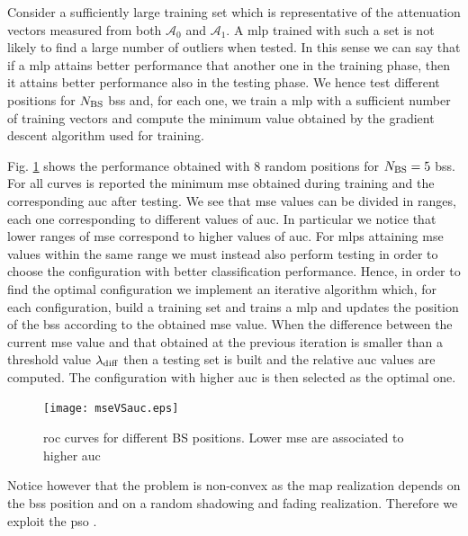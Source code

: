 \documentclass[twocolumns]{IEEEtran}
\begin{document}
Consider a sufficiently large training set which is representative of the attenuation vectors measured from both $\mathcal{A}_0$ and $\mathcal{A}_1$. A \ac{mlp} trained with such a set is not likely to find a large number of outliers when tested. In this sense we can say that if a \ac{mlp} attains better performance that another one in the training phase, then it attains better performance also in the testing phase. We hence test different positions for $N_{\rm BS}$ \acp{bs} and, for each one, we train a \ac{mlp} with a sufficient number of training vectors and compute the minimum value obtained by the gradient descent algorithm used for training.

Fig. \ref{fig:mseVSauc} shows the performance obtained with $8$ random positions for $N_{\rm BS}=5$ \acp{bs}. For all curves is reported the minimum \ac{mse} obtained during training and the corresponding \ac{auc} after testing. We see that \ac{mse} values can be divided in ranges, each one corresponding to different values of \ac{auc}. In particular we notice that lower ranges of \ac{mse} correspond to higher values of \ac{auc}. For \acp{mlp} attaining  \ac{mse} values within the same range we must instead also perform testing in order to choose the configuration with better classification performance. Hence, in order to find the optimal configuration we implement an iterative algorithm which, for each configuration, build a training set and trains a \ac{mlp} and updates the position of the \acp{bs} according to the obtained \ac{mse} value. When the difference between the current \ac{mse} value and that obtained at the previous iteration is smaller than a threshold value $\lambda_{\rm diff}$ then a testing set is built and the relative \ac{auc} values are computed. The configuration with higher \ac{auc} is then selected as the optimal one.

 \begin{figure}
     \centering
     \texttt{[image: mseVSauc.eps]}
     \caption{\ac{roc} curves for different BS positions. Lower \ac{mse} are associated to higher \ac{auc}}
     \label{fig:mseVSauc}
 \end{figure}

Notice however that the problem is non-convex as the map realization depends on the \acp{bs} position and on a random shadowing and fading realization. Therefore we exploit the \ac{pso} \cite{Kennedy-11}.
\end{document}

